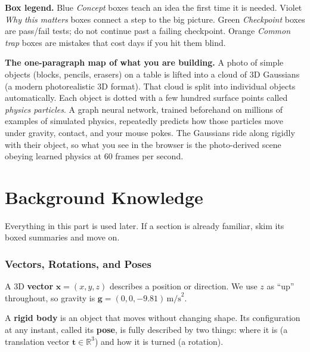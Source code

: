 \documentclass[11pt]{article}
\newcommand{\x}{\mathbf{x}}
\newcommand{\g}{\mathbf{g}}
\newcommand{\tr}{\mathbf{t}}
\begin{document}
\textbf{Box legend.} Blue \emph{Concept} boxes teach an idea the first time it is needed. Violet \emph{Why this matters} boxes connect a step to the big picture. Green \emph{Checkpoint} boxes are pass/fail tests; do not continue past a failing checkpoint. Orange \emph{Common trap} boxes are mistakes that cost days if you hit them blind.

\textbf{The one-paragraph map of what you are building.} A photo of simple objects (blocks, pencils, erasers) on a table is lifted into a cloud of 3D Gaussians (a modern photorealistic 3D format). That cloud is split into individual objects automatically. Each object is dotted with a few hundred surface points called \emph{physics particles}. A graph neural network, trained beforehand on millions of examples of simulated physics, repeatedly predicts how those particles move under gravity, contact, and your mouse pokes. The Gaussians ride along rigidly with their object, so what you see in the browser is the photo-derived scene obeying learned physics at 60 frames per second.

\part{Background Knowledge}

Everything in this part is used later. If a section is already familiar, skim its boxed summaries and move on.

\section{Vectors, Rotations, and Poses}

A 3D \textbf{vector} $\x = (x, y, z)$ describes a position or direction. We use $z$ as ``up'' throughout, so gravity is $\g = (0, 0, -9.81)\,\text{m/s}^2$.

A \textbf{rigid body} is an object that moves without changing shape. Its configuration at any instant, called its \textbf{pose}, is fully described by two things: where it is (a translation vector $\tr \in \mathbb{R}^3$) and how it is turned (a rotation).
\end{document}
